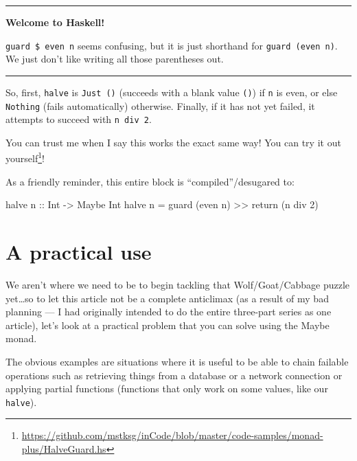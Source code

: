 \documentclass[]{article}
\newenvironment{Shaded}{}{}
\newcommand{\DataTypeTok}[1]{\textcolor[rgb]{0.56,0.13,0.00}{#1}}
\newcommand{\DecValTok}[1]{\textcolor[rgb]{0.25,0.63,0.44}{#1}}
\newcommand{\FunctionTok}[1]{\textcolor[rgb]{0.02,0.16,0.49}{#1}}
\newcommand{\NormalTok}[1]{#1}
\newcommand{\OperatorTok}[1]{\textcolor[rgb]{0.40,0.40,0.40}{#1}}
\newcommand{\OtherTok}[1]{\textcolor[rgb]{0.00,0.44,0.13}{#1}}
\renewcommand{\href}[2]{#2\footnote{\url{#1}}}
\begin{document}
\begin{center}\rule{0.5\linewidth}{\linethickness}\end{center}

\textbf{Welcome to Haskell!}

\texttt{guard\ \$\ even\ n} seems confusing, but it is just shorthand for
\texttt{guard\ (even\ n)}. We just don't like writing all those parentheses out.

\begin{center}\rule{0.5\linewidth}{\linethickness}\end{center}

So, first, \texttt{halve} is \texttt{Just\ ()} (succeeds with a blank value
\texttt{()}) if \texttt{n} is even, or else \texttt{Nothing} (fails
automatically) otherwise. Finally, if it has not yet failed, it attempts to
succeed with \texttt{n\ \textasciigrave{}div\textasciigrave{}\ 2}.

You can trust me when I say this works the exact same way! You can
\href{https://github.com/mstksg/inCode/blob/master/code-samples/monad-plus/HalveGuard.hs}{try
it out yourself}!

As a friendly reminder, this entire block is ``compiled''/desugared to:

\begin{Shaded}
\begin{Highlighting}[]
\NormalTok{halve}\OtherTok{ n ::} \DataTypeTok{Int} \OtherTok{{-}>} \DataTypeTok{Maybe} \DataTypeTok{Int}
\NormalTok{halve n }\OtherTok{=}\NormalTok{ guard (}\FunctionTok{even}\NormalTok{ n) }\OperatorTok{>>} \FunctionTok{return}\NormalTok{ (n }\OtherTok{\textasciigrave{}div\textasciigrave{}} \DecValTok{2}\NormalTok{)}
\end{Highlighting}
\end{Shaded}

\hypertarget{a-practical-use}{%
\section{A practical use}\label{a-practical-use}}

We aren't where we need to be to begin tackling that Wolf/Goat/Cabbage puzzle
yet\ldots so to let this article not be a complete anticlimax (as a result of my
bad planning --- I had originally intended to do the entire three-part series as
one article), let's look at a practical problem that you can solve using the
Maybe monad.

The obvious examples are situations where it is useful to be able to chain
failable operations such as retrieving things from a database or a network
connection or applying partial functions (functions that only work on some
values, like our \texttt{halve}).
\end{document}
